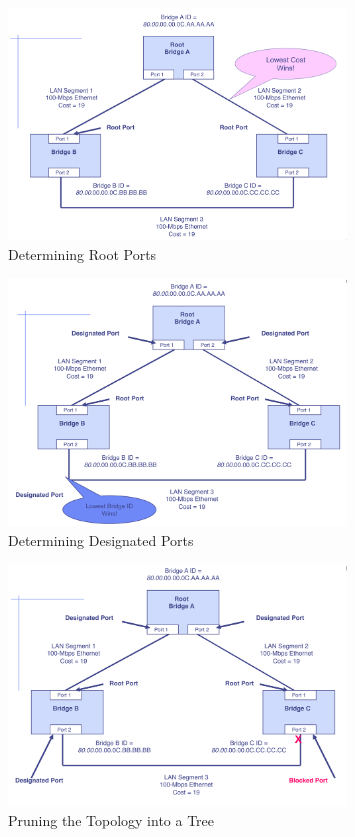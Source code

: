 \documentclass[a4paper,11pt]{article}
\begin{document}
\begin{figure}[H]
    \centering
    \includegraphics[width=0.8\textwidth]{./images/determine_root_ports.png}
    \caption{Determining Root Ports}
\end{figure}

\begin{figure}[H]
    \centering
    \includegraphics[width=0.8\textwidth]{./images/determine_designated_ports.png}
    \caption{Determining Designated Ports}
\end{figure}

\begin{figure}[H]
    \centering
    \includegraphics[width=0.8\textwidth]{./images/prune_into_tree.png}
    \caption{Pruning the Topology into a Tree}
\end{figure}
\end{document}

